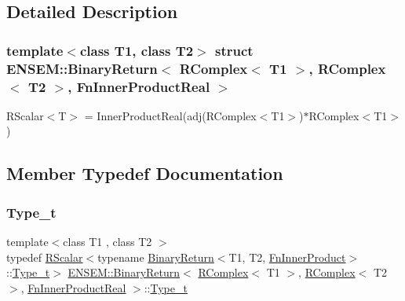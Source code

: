 \subsection{Detailed Description}
\subsubsection*{template$<$class T1, class T2$>$\newline
struct E\+N\+S\+E\+M\+::\+Binary\+Return$<$ R\+Complex$<$ T1 $>$, R\+Complex$<$ T2 $>$, Fn\+Inner\+Product\+Real $>$}

R\+Scalar$<$\+T$>$ = Inner\+Product\+Real(adj(\+R\+Complex$<$\+T1$>$)$\ast$\+R\+Complex$<$\+T1$>$) 

\subsection{Member Typedef Documentation}
\mbox{\label{structENSEM_1_1BinaryReturn_3_01RComplex_3_01T1_01_4_00_01RComplex_3_01T2_01_4_00_01FnInnerProductReal_01_4_a37cd0480a2d3d2805d49d50858e6bbad}} 
\subsubsection{\texorpdfstring{Type\_t}{Type\_t}\hspace{0.1cm}{\footnotesize\ttfamily [1/3]}}
{\footnotesize\ttfamily template$<$class T1 , class T2 $>$ \\
typedef \mbox{\hyperlink{classENSEM_1_1RScalar}{R\+Scalar}}$<$typename \mbox{\hyperlink{structENSEM_1_1BinaryReturn}{Binary\+Return}}$<$T1, T2, \mbox{\hyperlink{structENSEM_1_1FnInnerProduct}{Fn\+Inner\+Product}}$>$\+::\mbox{\hyperlink{structENSEM_1_1BinaryReturn_3_01RComplex_3_01T1_01_4_00_01RComplex_3_01T2_01_4_00_01FnInnerProductReal_01_4_a37cd0480a2d3d2805d49d50858e6bbad}{Type\+\_\+t}}$>$ \mbox{\hyperlink{structENSEM_1_1BinaryReturn}{E\+N\+S\+E\+M\+::\+Binary\+Return}}$<$ \mbox{\hyperlink{classENSEM_1_1RComplex}{R\+Complex}}$<$ T1 $>$, \mbox{\hyperlink{classENSEM_1_1RComplex}{R\+Complex}}$<$ T2 $>$, \mbox{\hyperlink{structENSEM_1_1FnInnerProductReal}{Fn\+Inner\+Product\+Real}} $>$\+::\mbox{\hyperlink{structENSEM_1_1BinaryReturn_3_01RComplex_3_01T1_01_4_00_01RComplex_3_01T2_01_4_00_01FnInnerProductReal_01_4_a37cd0480a2d3d2805d49d50858e6bbad}{Type\+\_\+t}}}

